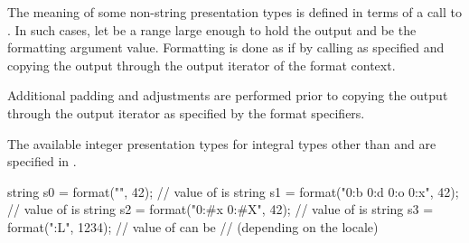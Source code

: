 \pnum
The meaning of some non-string presentation types
is defined in terms of a call to .
In such cases,
let  be a range
large enough to hold the  output
and  be the formatting argument value.
Formatting is done as if by calling  as specified
and copying the output through the output iterator of the format context.
\begin{note}
Additional padding and adjustments are performed
prior to copying the output through the output iterator
as specified by the format specifiers.
\end{note}

\pnum
The available integer presentation types
for integral types other than  and 
are specified in .
\begin{example}
\begin{codeblock}
string s0 = format("{}", 42);                           // value of  is 
string s1 = format("{0:b} {0:d} {0:o} {0:x}", 42);      // value of  is 
string s2 = format("{0:#x} {0:#X}", 42);                // value of  is 
string s3 = format("{:L}", 1234);                       // value of  can be 
                                                        // (depending on the locale)
\end{codeblock}
\end{example}

